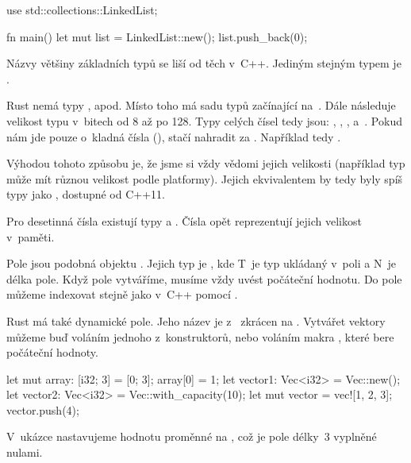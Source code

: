 \documentclass[main.tex]{subfiles}
\begin{document}
\obrazek
\begin{rustcode}
    use std::collections::LinkedList;

    fn main() {
        let mut list = LinkedList::new();
        list.push_back(0);
    }
\end{rustcode}


Názvy většiny základních typů se liší od těch v~C++. Jediným stejným typem je
.


Rust nemá typy ,  apod. Místo toho má sadu typů začínající
na~. Dále následuje velikost typu v~bitech od 8 až po 128. Typy celých čísel tedy
jsou: , , ,  a~. Pokud nám jde
pouze o~kladná čísla (), stačí nahradit  za . Například
tedy .

Výhodou tohoto způsobu je, že jsme si vždy vědomi jejich velikosti (například typ
 může mít různou velikost podle platformy). Jejich ekvivalentem by tedy byly
spíš typy jako , dostupné od C++11.

Pro desetinná čísla existují typy  a . Čísla opět reprezentují
jejich velikost v~paměti. \cite[sekce\,3.2]{thebook}


Pole jsou podobná objektu . Jejich typ je \irust{[T; N]}, kde T~je typ
ukládaný v~poli a N~je délka pole. Když pole vytváříme, musíme vždy uvést počáteční
hodnotu. Do pole můžeme indexovat stejně jako v~C++ pomocí \icpp{[]}.
\cite[sekce\,3.2]{thebook}

Rust má také dynamické pole. Jeho název je z~ zkrácen na .
Vytvářet vektory můžeme buď voláním jednoho z~konstruktorů, nebo voláním makra
, které bere počáteční hodnoty. \cite[sekce\,8.1]{thebook}

\obrazek
\begin{rustcode}
    let mut array: [i32; 3] = [0; 3];
    array[0] = 1;
    let vector1: Vec<i32> = Vec::new();
    let vector2: Vec<i32> = Vec::with_capacity(10);
    let mut vector = vec![1, 2, 3];
    vector.push(4);
\end{rustcode}

V~ukázce nastavujeme hodnotu proměnné  na \irust{[0; 3]}, což je pole délky~3
vyplněné nulami.
\end{document}
